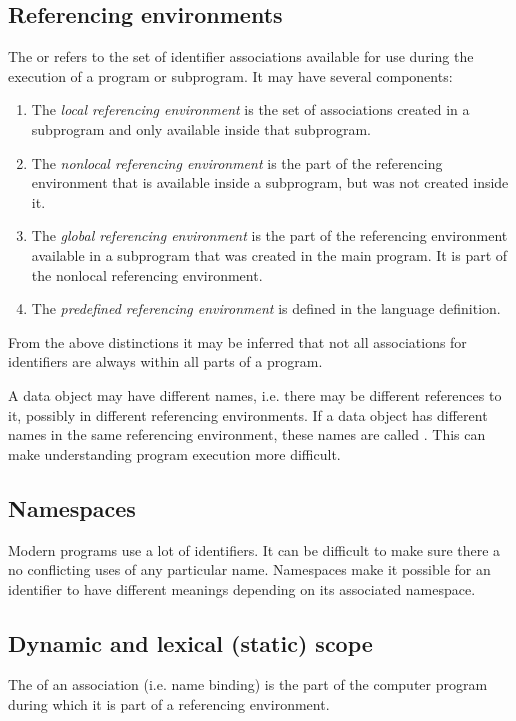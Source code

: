 \subsection{Referencing environments}
The  or refers to the set of identifier associations available for use during the execution of a program or subprogram. It may have several components:
\begin{enumerate}
\item The \textit{local referencing environment} is the set of associations created in a subprogram and only available inside that subprogram.
\item The \textit{nonlocal referencing environment} is the part of the referencing environment that is available inside a subprogram, but was not created inside it.
\item The \textit{global referencing environment} is the part of the referencing environment available in a subprogram that was created in the main program. It is part of the nonlocal referencing environment.
\item The \textit{predefined referencing environment} is defined in the language definition.
\end{enumerate}
From the above distinctions it may be inferred that not all associations for identifiers are always  within all parts of a program.

A data object may have different names, i.e. there may be different references to it, possibly in different referencing environments. If a data object has different names in the same referencing environment, these names are called . This can make understanding program execution more difficult.

\subsection{Namespaces}
Modern programs use a lot of identifiers. It can be difficult to make sure there a no conflicting uses of any particular name. Namespaces make it possible for an identifier to have different meanings depending on its associated namespace.

\subsection{Dynamic and lexical (static) scope}
The  of an association (i.e. name binding) is the part of the computer program during which it is part of a referencing environment.

